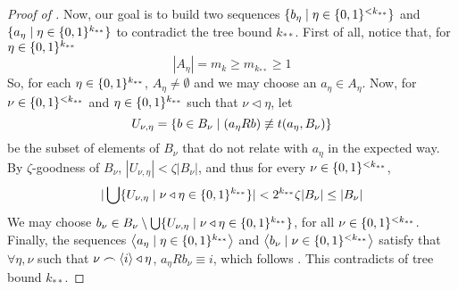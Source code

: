 \begin{proof}[Proof of ]
        Now, our goal is to build two sequences $\{ b_\eta \mid \eta \in \{ 0,1 \}^{<k_{**}} \}$ and
        $\{ a_\eta \mid \eta \in \{ 0,1 \}^{k_{**}} \}$ to contradict the tree bound $k_{**}$.
        First of all, notice that, for $\eta \in \{ 0,1 \}^{k_{**}}$
        \[
            |A_\eta| = m_k \geq m_{k_{**}} \geq 1
        \]
        So, for each $\eta \in \{ 0,1 \}^{k_{**}}$, $A_\eta \neq \emptyset$ and we may choose an $a_\eta \in A_\eta$.
        Now, for $\nu \in \{ 0,1 \}^{<k_{**}}$ and $\eta \in \{ 0,1 \}^{k_{**}}$ such that $\nu \triangleleft \eta$, let
        \[
            U_{\nu,\eta} = \{ b \in B_\nu \mid (a_\eta R b) \not\equiv t(a_\eta, B_\nu) \}
        \]
        be the subset of elements of $B_\nu$ that do not relate with $a_\eta$ in the expected way.
        By $\zeta$-goodness of $B_\nu$, $|U_{\nu, \eta}| < \zeta |B_\nu|$, and thus for every $\nu \in \{ 0,1 \}^{<k_{**}}$,
        \[
            | \bigcup\{  U_{\nu,\eta} \mid \nu \triangleleft \eta \in \{ 0,1 \}^{k_{**}} \} | <
            2^{k_{**}} \zeta |B_\nu| \leq |B_\nu|
        \]
        We may choose $b_\nu \in B_\nu \setminus \bigcup\{ U_{\nu,\eta} \mid \nu \triangleleft \eta \in \{ 0,1 \}^{k_{**}} \}$,
        for all $\nu \in \{ 0,1 \}^{<k_{**}}$.
        Finally, the sequences $\left< a_\eta \mid \eta \in \{ 0,1 \}^{k_{**}} \right>$ and
        $\left< b_\nu \mid \nu \in \{ 0,1 \}^{<k_{**}} \right>$ satisfy that $\forall \eta, \nu$ such that
        $\nu \frown \left< i \right> \triangleleft \eta$, $a_\eta R b_\nu \equiv i$, which follows
        .
        This contradicts  of tree bound $k_{**}$.
    \end{proof}

